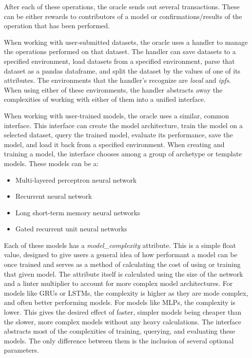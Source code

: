 \documentclass{article}
\begin{document}
    After each of these operations, the oracle sends out several transactions.  These can be either rewards to contributors
    of a model or confirmations/results of the operation that has been performed.

    When working with user-submitted datasets, the oracle uses a handler to manage the operations performed on that dataset.
    The handler can save datasets to a specified environment, load datasets from a specified environment, parse that dataset
    as a pandas dataframe, and split the dataset by the values of one of its attributes.  The environments that the handler's
    recognize are \textit{local} and \textit{ipfs}.  When using either of these environments, the handler abstracts away the
    complexities of working with either of them into a unified interface.

    When working with user-trained models, the oracle uses a similar, common interface.  This interface can create the model
    architecture, train the model on a selected dataset, query the trained model, evaluate its performance, save the model,
    and load it back from a specified environment.  When creating and training a model, the interface chooses among a group
    of archetype or template models.  These models can be a:

    \begin{itemize}
        \item Multi-layered perceptron neural network
        \item Recurrent neural network
        \item Long short-term memory neural networks
        \item Gated recurrent unit neural networks
    \end{itemize}

    Each of these models has a \textit{model\_complexity} attribute.  This is a simple float value, designed to give users
    a general idea of how performant a model can be once trained and serves as a method of calculating the cost of using
    or training that given model.  The attribute itself is calculated using the size of the network and a linter multiplier to
    account for more complex model architectures.  For models like GRUs or LSTMs, the complexity is higher as they are mode complex, and often
    better performing models.  For models like MLPs, the complexity is lower.  This gives the desired effect of faster, simpler
    models being cheaper than the slower, more complex models without any heavy calculations.   The interface abstracts most
    of the complexities of training, querying, and evaluating these models.  The only difference between them is the inclusion
    of several optional parameters.
\end{document}
